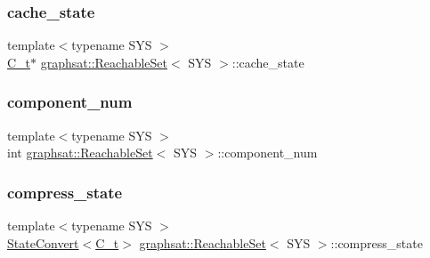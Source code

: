 \subsubsection{\texorpdfstring{cache\_state}{cache\_state}}
{\footnotesize\ttfamily template$<$typename S\+YS $>$ \\
\mbox{\hyperlink{classgraphsat_1_1_reachable_set_a0b7981a216ec4c46be913e08d5f0cd07}{C\+\_\+t}}$\ast$ \mbox{\hyperlink{classgraphsat_1_1_reachable_set}{graphsat\+::\+Reachable\+Set}}$<$ S\+YS $>$\+::cache\+\_\+state\hspace{0.3cm}{\ttfamily [private]}}

\mbox{\label{classgraphsat_1_1_reachable_set_a6441fa7ce730a7f957fee673acf7c3d0}} 
\subsubsection{\texorpdfstring{component\_num}{component\_num}}
{\footnotesize\ttfamily template$<$typename S\+YS $>$ \\
int \mbox{\hyperlink{classgraphsat_1_1_reachable_set}{graphsat\+::\+Reachable\+Set}}$<$ S\+YS $>$\+::component\+\_\+num\hspace{0.3cm}{\ttfamily [private]}}

\mbox{\label{classgraphsat_1_1_reachable_set_a87d3304d159d7cfe38c511d96087fbba}} 
\subsubsection{\texorpdfstring{compress\_state}{compress\_state}}
{\footnotesize\ttfamily template$<$typename S\+YS $>$ \\
\mbox{\hyperlink{classgraphsat_1_1_state_convert}{State\+Convert}}$<$\mbox{\hyperlink{classgraphsat_1_1_reachable_set_a0b7981a216ec4c46be913e08d5f0cd07}{C\+\_\+t}}$>$ \mbox{\hyperlink{classgraphsat_1_1_reachable_set}{graphsat\+::\+Reachable\+Set}}$<$ S\+YS $>$\+::compress\+\_\+state\hspace{0.3cm}{\ttfamily [private]}}

